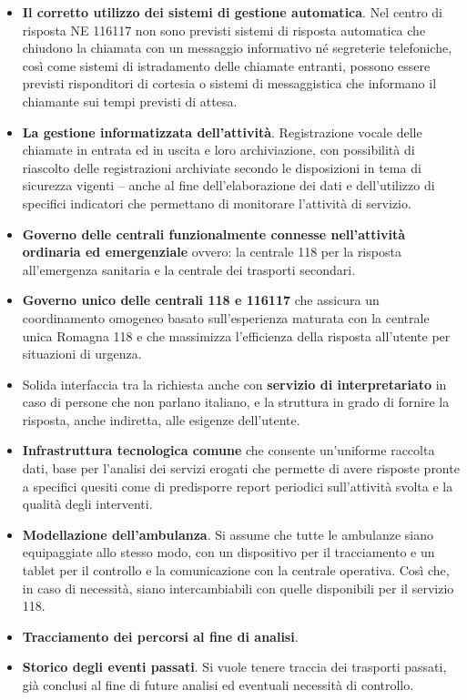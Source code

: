 \documentclass[12pt]{article}
\begin{document}
\begin{itemize}
    \item \textbf{Il corretto utilizzo dei sistemi di gestione automatica}. Nel centro di risposta NE 116117 non sono previsti sistemi di risposta automatica che chiudono la chiamata con un messaggio informativo né segreterie telefoniche, così come sistemi di istradamento delle chiamate entranti, possono essere previsti risponditori di cortesia o sistemi di messaggistica che informano il chiamante sui tempi previsti di attesa.
    \item \textbf{La gestione informatizzata dell'attività}. Registrazione vocale delle chiamate in entrata ed in uscita e loro archiviazione, con possibilità di riascolto delle registrazioni archiviate secondo le disposizioni in tema di sicurezza vigenti – anche al fine dell'elaborazione dei dati e dell'utilizzo di specifici indicatori che permettano di monitorare l’attività di servizio.
    \item \textbf{Governo delle centrali funzionalmente connesse nell'attività ordinaria ed emergenziale} ovvero: la centrale 118 per la risposta all'emergenza sanitaria e la centrale dei trasporti secondari.
    \item \textbf{Governo unico delle centrali 118 e 116117} che assicura un coordinamento omogeneo basato sull'esperienza maturata con la centrale unica Romagna 118 e che massimizza l’efficienza della risposta all'utente per situazioni di urgenza.
    \item Solida interfaccia tra la richiesta anche con \textbf{servizio di interpretariato} in caso di persone che non parlano italiano, e la struttura in grado di fornire la risposta, anche indiretta, alle esigenze dell'utente.
    \item \textbf{Infrastruttura tecnologica comune} che consente un'uniforme raccolta dati, base per l'analisi dei servizi erogati che permette di avere risposte pronte a specifici quesiti come di predisporre report periodici sull'attività svolta e la qualità degli interventi. 
    \item \textbf{Modellazione dell'ambulanza}. Si assume che tutte le ambulanze siano equipaggiate allo stesso modo, con un dispositivo per il tracciamento e un tablet per il controllo e la comunicazione con la centrale operativa. Così che, in caso di necessità, siano intercambiabili con quelle disponibili per il servizio 118.
    \item \textbf{Tracciamento dei percorsi al fine di analisi}. 
    \item \textbf{Storico degli eventi passati}. Si vuole tenere traccia dei trasporti passati, già conclusi al fine di future analisi ed eventuali necessità di controllo.

\end{itemize}
\end{document}

